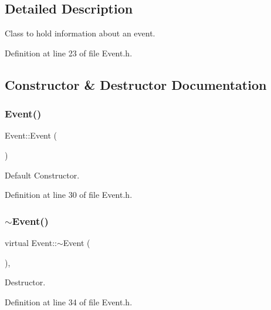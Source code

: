 \subsection{Detailed Description}
Class to hold information about an event. 

Definition at line 23 of file Event.\+h.



\subsection{Constructor \& Destructor Documentation}
\hypertarget{class_event_a5a40dd4708297f7031e29b39e039ae10}{}\label{class_event_a5a40dd4708297f7031e29b39e039ae10} 
\subsubsection{\texorpdfstring{Event()}{Event()}\hspace{0.1cm}{\footnotesize\ttfamily [1/3]}}
{\footnotesize\ttfamily Event\+::\+Event (\begin{DoxyParamCaption}{ }\end{DoxyParamCaption})\hspace{0.3cm}{\ttfamily [inline]}}



Default Constructor. 



Definition at line 30 of file Event.\+h.

\hypertarget{class_event_ab864fd85c758006c42cd7a1b3369b483}{}\label{class_event_ab864fd85c758006c42cd7a1b3369b483} 
\subsubsection{\texorpdfstring{$\sim$\+Event()}{~Event()}}
{\footnotesize\ttfamily virtual Event\+::$\sim$\+Event (\begin{DoxyParamCaption}{ }\end{DoxyParamCaption})\hspace{0.3cm}{\ttfamily [inline]}, {\ttfamily [virtual]}}



Destructor. 



Definition at line 34 of file Event.\+h.

\hypertarget{class_event_aa79f43b0c42280875280ec071aa2eea1}{}\label{class_event_aa79f43b0c42280875280ec071aa2eea1} 
